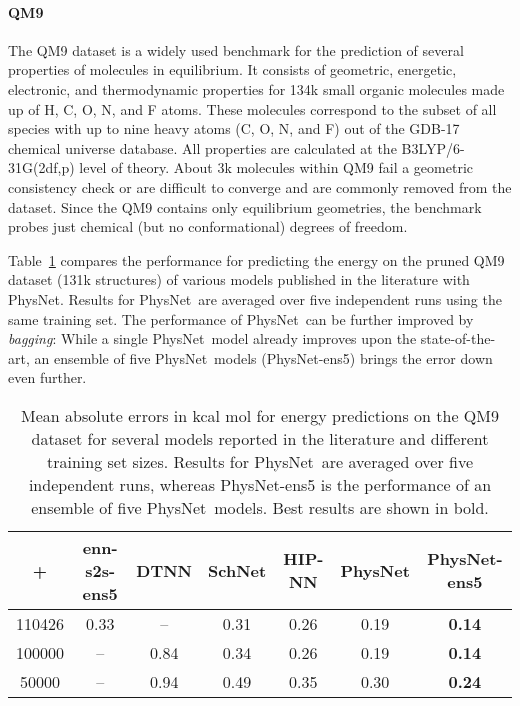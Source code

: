 \documentclass[12pt]{article}
\newcommand{\nn}{PhysNet}
\begin{document}
\paragraph{QM9}
The QM9 dataset\cite{ramakrishnan2014quantum} is a widely used
benchmark for the prediction of several properties of molecules in
equilibrium. It consists of geometric, energetic, electronic, and
thermodynamic properties for 134k small organic molecules
made up of H, C, O, N, and F atoms. These molecules correspond to the
subset of all species with up to nine heavy atoms (C, O, N, and F) out
of the GDB-17 chemical universe
database.\cite{ruddigkeit2012enumeration} All properties are
calculated at the B3LYP/6-31G(2df,p) level of theory. About 3k
molecules within QM9 fail a geometric consistency check or are
difficult to converge\cite{ramakrishnan2014quantum} and are commonly
removed from the
dataset.\cite{faber2017prediction,gilmer2017neural,schutt2017schnet,lubbers2018hierarchical}
Since the QM9 contains only equilibrium geometries, the benchmark
probes just chemical (but no conformational) degrees of freedom.

Table~\ref{tab:qm9_results} compares the performance for predicting
the energy on the pruned QM9 dataset (131k structures) of
various models published in the literature with \nn. Results for
\nn\ are averaged over five independent runs using the same training
set. The performance of \nn\ can be further improved by
\textit{bagging}:\cite{breiman1996bagging} While a single \nn\ model
already improves upon the state-of-the-art, an ensemble of five
\nn\ models (\nn-ens5) brings the error down even further.

\begin{table}[htbp]
\captionsetup{width=0.85\textwidth}
\caption{Mean absolute errors in kcal mol for energy
  predictions on the QM9 dataset for several models reported in the
  literature and different training set sizes. Results for \nn\ are
  averaged over five independent runs, whereas \nn-ens5 is the
  performance of an ensemble\cite{breiman1996bagging} of five
  \nn\ models. Best results are shown in bold.}
\label{tab:qm9_results}
	
	\centering
	\begin{tabular}{c c c c c c c}
	\toprule
	 +   &
	\textbf{enn-s2s-ens5}\cite{gilmer2017neural} &
	\textbf{DTNN}\cite{schutt2017quantum} & \textbf{SchNet}\cite{schutt2017schnet} &  
	\textbf{HIP-NN}\cite{lubbers2018hierarchical} & 
 	\textbf{\nn} & 
 	\textbf{\nn-ens5}\\
	\midrule
	\num{110426} &  0.33 & --&  0.31 & 0.26  &0.19  & \bf 0.14\\
	\addlinespace[1pt]
	\num{100000}    & --  & 0.84  & 0.34 & 0.26  & 0.19 &  \bf 0.14\\
	\addlinespace[1pt]
	\num{50000}   & --  & 0.94 &  0.49 & 0.35  & 0.30 & \bf 0.24\\
	\bottomrule
	\end{tabular}
\end{table}
\end{document}
